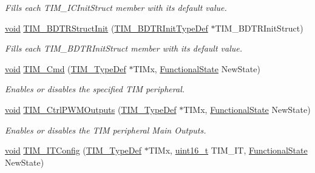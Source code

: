\begin{DoxyCompactItemize}
\begin{DoxyCompactList}\small\item\em Fills each T\+I\+M\+\_\+\+I\+C\+Init\+Struct member with its default value. \end{DoxyCompactList}\item 
\hyperlink{usb__devapi_8h_afabf60e7f57651d6d595a02c75f07cd0}{void} \hyperlink{group___t_i_m___exported___functions_gaea0f49938cda8ae0738162194798afc6}{T\+I\+M\+\_\+\+B\+D\+T\+R\+Struct\+Init} (\hyperlink{struct_t_i_m___b_d_t_r_init_type_def}{T\+I\+M\+\_\+\+B\+D\+T\+R\+Init\+Type\+Def} $\ast$T\+I\+M\+\_\+\+B\+D\+T\+R\+Init\+Struct)
\begin{DoxyCompactList}\small\item\em Fills each T\+I\+M\+\_\+\+B\+D\+T\+R\+Init\+Struct member with its default value. \end{DoxyCompactList}\item 
\hyperlink{usb__devapi_8h_afabf60e7f57651d6d595a02c75f07cd0}{void} \hyperlink{group___t_i_m___exported___functions_ga2bdc275bcbd2ce9d1ba632e6c89896b7}{T\+I\+M\+\_\+\+Cmd} (\hyperlink{struct_t_i_m___type_def}{T\+I\+M\+\_\+\+Type\+Def} $\ast$T\+I\+Mx, \hyperlink{agilefox_2library_2inc_2stm32f10x__type_8h_ac9a7e9a35d2513ec15c3b537aaa4fba1}{Functional\+State} New\+State)
\begin{DoxyCompactList}\small\item\em Enables or disables the specified T\+IM peripheral. \end{DoxyCompactList}\item 
\hyperlink{usb__devapi_8h_afabf60e7f57651d6d595a02c75f07cd0}{void} \hyperlink{group___t_i_m___exported___functions_ga3e59ebced2ab8e0b817c460f1670e97d}{T\+I\+M\+\_\+\+Ctrl\+P\+W\+M\+Outputs} (\hyperlink{struct_t_i_m___type_def}{T\+I\+M\+\_\+\+Type\+Def} $\ast$T\+I\+Mx, \hyperlink{agilefox_2library_2inc_2stm32f10x__type_8h_ac9a7e9a35d2513ec15c3b537aaa4fba1}{Functional\+State} New\+State)
\begin{DoxyCompactList}\small\item\em Enables or disables the T\+IM peripheral Main Outputs. \end{DoxyCompactList}\item 
\hyperlink{usb__devapi_8h_afabf60e7f57651d6d595a02c75f07cd0}{void} \hyperlink{group___t_i_m___exported___functions_ga70e3d6c09d55ee69002e154c85cd40e4}{T\+I\+M\+\_\+\+I\+T\+Config} (\hyperlink{struct_t_i_m___type_def}{T\+I\+M\+\_\+\+Type\+Def} $\ast$T\+I\+Mx, \hyperlink{_p_e___types_8h_a1f1825b69244eb3ad2c7165ddc99c956}{uint16\+\_\+t} T\+I\+M\+\_\+\+IT, \hyperlink{agilefox_2library_2inc_2stm32f10x__type_8h_ac9a7e9a35d2513ec15c3b537aaa4fba1}{Functional\+State} New\+State)

\end{DoxyCompactItemize}
